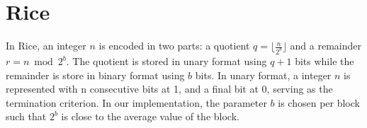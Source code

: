 \begin{table}
%
\caption{Variable Byte algorithms. L denotes the array to be compressed, LC its
compressed array. The Algorithm~\ref{lst:vbyte-dcmp} decompress the values in
LC, returned by the Algorithm~\ref{lst:vbyte-cmp}.}
\label{tab:vbyte}
\end{table}

\section{Rice}

In Rice, an integer $n$ is encoded in two parts: a quotient $q = \lfloor
\frac{n}{2^b} \rfloor$ and a remainder $r = n \bmod 2^b$. The quotient is
stored in unary format using $q + 1$ bits while the remainder is store in
binary format using $b$ bits. In unary format, a integer $n$ is represented
with n consecutive bits at 1, and a final bit at 0, serving as the termination
criterion. In our implementation, the parameter $b$ is chosen per block such
that $2^b$ is close to the average value of the block.

